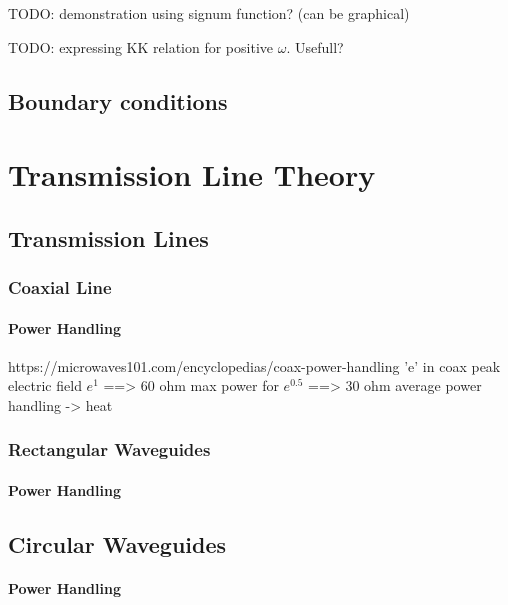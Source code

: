 TODO: demonstration using signum function? (can be graphical)

TODO: expressing KK relation for positive $\omega$. Usefull?

\subsection{Boundary conditions}

\section{Transmission Line Theory}
\subsection{Transmission Lines}
\subsubsection{Coaxial Line}
\paragraph{Power Handling}
https://microwaves101.com/encyclopedias/coax-power-handling
'e' in coax
peak electric field $e^1$  ==> 60 ohm
max power for $ e^0.5$  ==> 30 ohm
average power handling -> heat 
\subsubsection{Rectangular Waveguides}
\paragraph{Power Handling}

\subsection{Circular Waveguides}
\paragraph{Power Handling}


